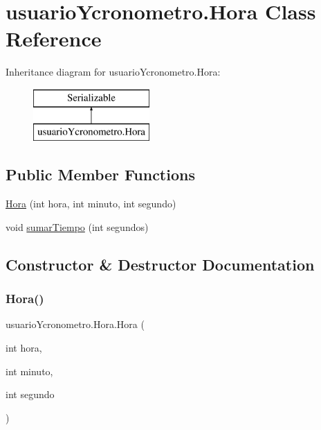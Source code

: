 \hypertarget{classusuario_ycronometro_1_1_hora}{}\section{usuario\+Ycronometro.\+Hora Class Reference}
\label{classusuario_ycronometro_1_1_hora}
Inheritance diagram for usuario\+Ycronometro.\+Hora\+:\begin{figure}[H]
\begin{center}
\leavevmode
\includegraphics[height=2.000000cm]{classusuario_ycronometro_1_1_hora}
\end{center}
\end{figure}
\subsection*{Public Member Functions}
\begin{DoxyCompactItemize}
\item 
\mbox{\hyperlink{classusuario_ycronometro_1_1_hora_a98a7c3a9ec9216f5664ceab5f7fd9669}{Hora}} (int hora, int minuto, int segundo)
\item 
void \mbox{\hyperlink{classusuario_ycronometro_1_1_hora_a132ed50542595839eff6cbd1c7a82f88}{sumar\+Tiempo}} (int segundos)
\end{DoxyCompactItemize}


\subsection{Constructor \& Destructor Documentation}
\mbox{\label{classusuario_ycronometro_1_1_hora_a98a7c3a9ec9216f5664ceab5f7fd9669}} 
\subsubsection{\texorpdfstring{Hora()}{Hora()}}
{\footnotesize\ttfamily usuario\+Ycronometro.\+Hora.\+Hora (\begin{DoxyParamCaption}\item[{int}]{hora,  }\item[{int}]{minuto,  }\item[{int}]{segundo }\end{DoxyParamCaption})}



